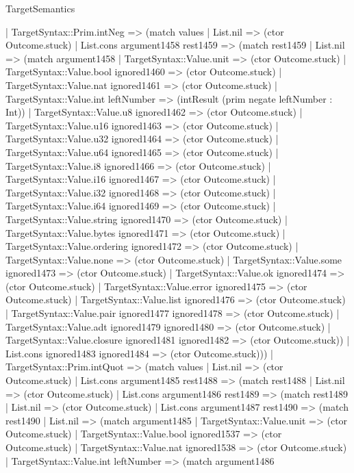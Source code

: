 \begin{lexlean}{TargetSemantics}
\begin{semanticmodule}
{    | TargetSyntax::Prim.intNeg => (match values
      | List.nil => (ctor Outcome.stuck)
      | List.cons argument1458 rest1459 => (match rest1459
        | List.nil => (match argument1458
          | TargetSyntax::Value.unit => (ctor Outcome.stuck)
          | TargetSyntax::Value.bool ignored1460 => (ctor Outcome.stuck)
          | TargetSyntax::Value.nat ignored1461 => (ctor Outcome.stuck)
          | TargetSyntax::Value.int leftNumber => (intResult (prim negate leftNumber : Int))
          | TargetSyntax::Value.u8 ignored1462 => (ctor Outcome.stuck)
          | TargetSyntax::Value.u16 ignored1463 => (ctor Outcome.stuck)
          | TargetSyntax::Value.u32 ignored1464 => (ctor Outcome.stuck)
          | TargetSyntax::Value.u64 ignored1465 => (ctor Outcome.stuck)
          | TargetSyntax::Value.i8 ignored1466 => (ctor Outcome.stuck)
          | TargetSyntax::Value.i16 ignored1467 => (ctor Outcome.stuck)
          | TargetSyntax::Value.i32 ignored1468 => (ctor Outcome.stuck)
          | TargetSyntax::Value.i64 ignored1469 => (ctor Outcome.stuck)
          | TargetSyntax::Value.string ignored1470 => (ctor Outcome.stuck)
          | TargetSyntax::Value.bytes ignored1471 => (ctor Outcome.stuck)
          | TargetSyntax::Value.ordering ignored1472 => (ctor Outcome.stuck)
          | TargetSyntax::Value.none => (ctor Outcome.stuck)
          | TargetSyntax::Value.some ignored1473 => (ctor Outcome.stuck)
          | TargetSyntax::Value.ok ignored1474 => (ctor Outcome.stuck)
          | TargetSyntax::Value.error ignored1475 => (ctor Outcome.stuck)
          | TargetSyntax::Value.list ignored1476 => (ctor Outcome.stuck)
          | TargetSyntax::Value.pair ignored1477 ignored1478 => (ctor Outcome.stuck)
          | TargetSyntax::Value.adt ignored1479 ignored1480 => (ctor Outcome.stuck)
          | TargetSyntax::Value.closure ignored1481 ignored1482 => (ctor Outcome.stuck))
        | List.cons ignored1483 ignored1484 => (ctor Outcome.stuck)))
    | TargetSyntax::Prim.intQuot => (match values
      | List.nil => (ctor Outcome.stuck)
      | List.cons argument1485 rest1488 => (match rest1488
        | List.nil => (ctor Outcome.stuck)
        | List.cons argument1486 rest1489 => (match rest1489
          | List.nil => (ctor Outcome.stuck)
          | List.cons argument1487 rest1490 => (match rest1490
            | List.nil => (match argument1485
              | TargetSyntax::Value.unit => (ctor Outcome.stuck)
              | TargetSyntax::Value.bool ignored1537 => (ctor Outcome.stuck)
              | TargetSyntax::Value.nat ignored1538 => (ctor Outcome.stuck)
              | TargetSyntax::Value.int leftNumber => (match argument1486
}
\end{semanticmodule}
\end{lexlean}
